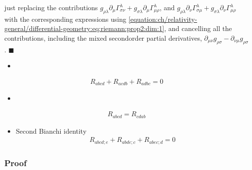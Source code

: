 \documentclass[letterpaper,10pt,english]{jupyterBook}
\begin{document}
\sphinxAtStartPar
just replacing the contributions \(g_{\rho \lambda} \partial_{\mu} \Gamma^{\lambda}_{\sigma \nu} + g_{\sigma \lambda} \partial_{\mu} \Gamma^{\lambda}_{\mu \rho}\), and \(g_{\rho \lambda} \partial_{\nu} \Gamma^{\lambda}_{\sigma \mu} + g_{\sigma \lambda} \partial_{\nu} \Gamma^{\lambda}_{\mu \rho}\) with the corresponding expressions using \eqref{equation:ch/relativity-general/differential-geometry:eq:riemann:prop2:dim:1}, and cancelling all the contributions, including the mixed second\sphinxhyphen{}order partial derivatives, \(\partial_{\mu \nu} g_{\rho \sigma} - \partial_{\nu \mu} g_{\rho \sigma}\). \(\blacksquare\)
\begin{itemize}
\item {} 
\end{itemize}
\begin{equation}\label{equation:ch/relativity-general/differential-geometry:eq:riemann:prop:3}
\begin{split}R_{abcd} + R_{acdb} + R_{adbc} = 0\end{split}
\end{equation}\begin{itemize}
\item {} 
\end{itemize}
\begin{equation}\label{equation:ch/relativity-general/differential-geometry:eq:riemann:prop:4}
\begin{split}R_{abcd} = R_{cdab}\end{split}
\end{equation}\begin{itemize}
\item {} 
\sphinxAtStartPar
Second Bianchi identity
\begin{equation}\label{equation:ch/relativity-general/differential-geometry:eq:riemann:prop:5}
\begin{split}R_{abcd;e} + R_{abde;c} + R_{abec;d} = 0\end{split}
\end{equation}
\end{itemize}
\subsubsection*{Proof}



\sphinxAtStartPar
{}
\end{document}

